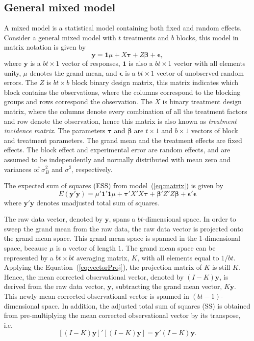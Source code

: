 \documentclass[article]{jss}
\begin{document}
\subsection{General mixed model}\label{subsec:decompRCD}
A mixed model is a statistical model containing both fixed and random effects. Consider a general mixed model with $t$ treatments and $b$ blocks, this model in matrix notation is given by 
\begin{equation}\label{eq:matrix}
\bm{y} = \bm{1}\mu + X\bm{\tau} + Z\bm{\beta} + \bm{\epsilon},
\end{equation}
where $\bm{y}$ is a $bt \times 1$ vector of responses, $\bm{1}$ is also a $bt \times 1$ vector with all elements unity, $\mu$ denotes the grand mean, and $\bm{\epsilon}$ is a $bt \times 1$ vector of unobserved random errors. The $Z$ is $bt \times b$ block binary design matrix, this matrix indicates which block contains the observations, where the columns correspond to the blocking groups and rows correspond the observation. The $X$ is binary treatment design matrix, where the columns denote every combination of all the treatment factors and row denote the observation, hence this matrix is also known as \emph{treatment incidence matrix}. The parameters $\bm{\tau}$ and $\bm{\beta}$ are $t \times 1$ and $b \times 1$ vectors of block and treatment parameters. The grand mean and the treatment effects are fixed effects. The block effect and experimental error are random effects, and are assumed to be independently and normally distributed with mean zero and variances of $\sigma_{B}^2$ and $\sigma^2$, respectively. 

The expected sum of squares (ESS) from model~(\ref{eq:matrix}) is given by
\begin{equation}\label{eq:ESS}
E(\bm{y}'\bm{y}) = \mu'  \bm{1}' \bm{1} \mu + \bm{\tau} ' X'X \bm{\tau}  + \bm{\beta}' Z'Z \bm{\beta} + \bm{\epsilon}' \bm{\epsilon}
\end{equation}
where $\bm{y}'\bm{y}$ denotes unadjusted total sum of squares.

The raw data vector, denoted by $\bm{y}$, spans a $bt$-dimensional space. In order to sweep the grand mean from the raw data, the raw data vector is projected onto the grand mean space. This grand mean space is spanned in the $1$-dimensional space, because $\mu$ is a vector of length $1$. The grand mean space can be represented by a $bt \times bt$ averaging matrix, $K$, with all elements equal to $1/bt$. Applying the Equation~(\ref{eq:vectorProj}), the projection matrix of $K$ is still $K$. Hence, the mean corrected observational vector, denoted by $(I-K)\bm{y}$, is derived from the raw data vector, $\bm{y}$, subtracting the grand mean vector, $K\bm{y}$. This newly mean corrected observational vector is spanned in $(bt - 1)$-dimensional space. In addition, the adjusted total sum of squares (SS) is obtained from pre-multiplying the mean corrected observational vector by its transpose, i.e.
\begin{equation}\label{eq:adjustSS}
[(I - K)\bm{y}]'[(I - K)\bm{y}] = \bm{y}'(I-K)\bm{y}.
\end{equation}
\end{document}
